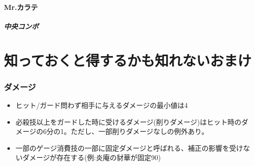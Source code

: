 \documentclass[a4j,11pt]{jarticle}
\begin{document}
\subsection{Mr.カラテ}
\subsubsection{中央コンボ}

\part{知っておくと得するかも知れないおまけ}
\section{ダメージ}
\begin{itemize}
  \item ヒット/ガード問わず相手に与えるダメージの最小値は4
  \item 必殺技以上をガードした時に受けるダメージ(削りダメージ)はヒット時のダメージの6分の1。ただし、一部削りダメージなしの例外あり。
  \item 一部のゲージ消費技の一部に固定ダメージと呼ばれる、補正の影響を受けないダメージが存在する(例:炎庵の豺華が固定90)
\end{itemize}
\end{document}
